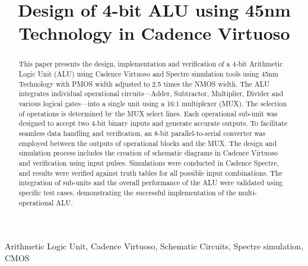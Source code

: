 \documentclass[conference]{IEEEtran}
\begin{document}
\title{Design of 4-bit ALU using 45nm Technology in Cadence Virtuoso\\}

\author{
}

\maketitle
\thispagestyle{plain}
\pagestyle{plain}

\begin{abstract}
This paper presents the design, implementation and verification of a 4-bit Arithmetic Logic Unit (ALU) using Cadence Virtuoso and Spectre simulation tools using 45nm Technology with PMOS width adjusted to 2.5 times the NMOS width. The ALU integrates individual operational circuits—Adder, Subtractor, Multiplier, Divider and various logical gates—into a single unit using a 16:1 multiplexer (MUX). The selection of operations is determined by the MUX select lines. Each operational sub-unit was designed to accept two 4-bit binary inputs and generate accurate outputs. To facilitate seamless data handling and verification, an 8-bit parallel-to-serial converter was employed between the outputs of operational blocks and the MUX. The design and simulation process includes the creation of schematic diagrams in  Cadence  Virtuoso and verification using input pulses. Simulations were conducted in Cadence Spectre, and results were verified against truth tables for all possible input combinations. The integration of sub-units and the overall performance of the ALU were validated using specific test cases, demonstrating the successful implementation of the multi-operational ALU.
\end{abstract}
\begin{IEEEkeywords}
Arithmetic Logic Unit, Cadence Virtuoso, Schematic Circuits, Spectre simulation, CMOS
\end{IEEEkeywords}
\end{document}
